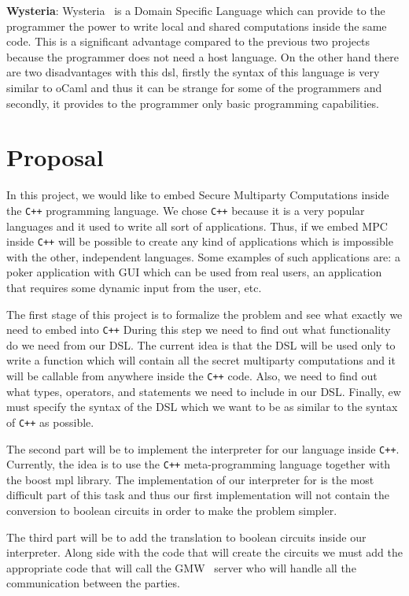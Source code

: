 \documentclass[paper=a4, fontsize=11pt]{scrartcl} %
\numberwithin{equation}{section} %
\numberwithin{figure}{section} %
\numberwithin{table}{section} %
\begin{document}
\noindent
\textbf{Wysteria}: Wysteria~\cite{Wysteria} is a Domain Specific Language which can provide to the programmer the power to write local and shared computations inside the same code. This is a significant advantage compared to the previous two projects because the programmer does not need a host language. On the other hand there are two disadvantages with this dsl, firstly the syntax of this language is very similar to oCaml and thus it can be strange for some of the programmers and secondly, it provides to the  programmer only basic programming capabilities.
 
\section{Proposal}

In this project, we would like to embed Secure Multiparty Computations inside the {\tt C++} programming language. We chose {\tt C++} because it is a very popular languages and it used to write all sort of applications. Thus, if we embed MPC inside {\tt C++} will be possible to create any kind of applications which is impossible with the other, independent languages. Some examples of such applications are: a poker application with GUI which can be used from real users, an application that requires some dynamic input from the user, etc.

The first stage of this project is to formalize the problem and see what exactly we need to embed into {\tt C++}  During this step we need to find out what functionality do we need from our DSL. The current idea is that the DSL will be used only to write a function which will contain all the secret multiparty computations and it will be callable from anywhere inside the {\tt C++} code. Also, we need to find out what types, operators, and statements we need to include in our DSL. Finally, ew must specify the syntax of the DSL which we want to be as similar to the syntax of {\tt C++} as possible.

The second part will be to implement the interpreter for our language inside {\tt C++}. Currently, the idea is to use the {\tt C++} meta-programming language together with the boost mpl library. The implementation of our interpreter for is the most difficult part of this task and thus our first implementation will not contain the conversion to boolean circuits in order to make the problem simpler. 

The third part will be to add the translation to boolean circuits inside our interpreter. Along side with the code that will create the circuits we must add the appropriate code that will call the GMW~\cite{GMW} server who will handle all the communication between the parties.
\end{document}
